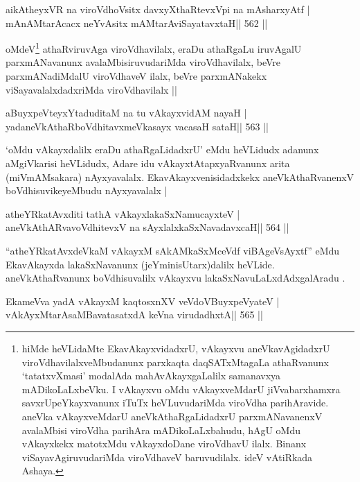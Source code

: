\begin{shl}
aikAtheyxVR na viroVdhoV\s sitx davxyXthaRtevxV\s pi na mAsharxyAtf |
mAnAMtarAcacx neYvAsitx mAMtarAviSayatavxtaH\hfill || 562 ||
\end{shl}

\begin{artha}
oMdeV\footnote[1]{hiMde heVLidaMte EkavAkayxvidadxrU, vAkayxvu
  aneVkavAgidadxrU viroVdhavilalxveMbudanunx parxkaqta daqSATxMtagaLa
  athaRvanunx `tatatxvXmasi' modalAda mahAvAkayxgaLalilx samanavxya
  mADikoLaLxbeVku. I vAkayxvu oMdu vAkayxveMdarU jiVvabarxhamxra
  savxrUpeYkayxvanunx iTuTx heVLuvudariMda viroVdha parihAravide.
  aneVka vAkayxveMdarU aneVkAthaRgaLidadxrU parxmANavanenxV avalaMbisi
  viroVdha parihAra mADikoLaLxbahudu, hAgU oMdu vAkayxkekx matotxMdu
  vAkayxdoDane viroVdhavU ilalx. Binanx viSayavAgiruvudariMda
  viroVdhaveV baruvudilalx. ideV vAtiRkada Ashaya.} athaRviruvAga viroVdhavilalx, eraDu athaRgaLu iruvAgalU
parxmANavanunx avalaMbisiruvudariMda viroVdhavilalx, beVre
parxmANadiMdalU viroVdhaveV ilalx, beVre parxmANakekx
viSayavalalxdadxriMda viroVdhavilalx ||
\end{artha}

\begin{shl}
aBuyxpeVteyxYtaduditaM na tu vAkayxvidAM nayaH |
yadaneVkAthaRboVdhitavxmeVkasayx vacasaH sataH\hfill || 563 ||
\end{shl}

\begin{artha}
`oMdu vAkayxdalilx eraDu athaRgaLidadxrU' eMdu heVLidudx adanunx
  aMgiVkarisi heVLidudx, Adare idu vAkayxtAtapxyaRvanunx arita
  (miVmAMsakara) nAyxyavalalx. EkavAkayxvenisidadxkekx
  aneVkAthaRvanenxV boVdhisuvikeyeMbudu nAyxyavalalx |
\end{artha}



\begin{shl}
atheYRkatAvxditi tathA vAkayxlakaSxNamucayxteV |
aneVkAthARvavoVdhitevxV na sAyxlalxkaSxNavadavxcaH\hfill || 564 ||
\end{shl}

\begin{artha}
``atheYRkatAvxdeVkaM vAkayxM sAkAMkaSxMceVdf viBAgeVsAyxtf'' eMdu   EkavAkayxda lakaSxNavanunx (jeYminisUtarx)dalilx heVLide.   aneVkAthaRvanunx boVdhisuvalilx vAkayxvu lakaSxNavuLaLxdAdxgalAradu   .
\end{artha}

\begin{shl}
EkameVva yadA vAkayxM kaqtosxnXV veVdoV\s BuyxpeVyateV |
vAkAyxMtarAsaMBavatasatxdA keVna virudadhxtA\hfill || 565 ||
\end{shl}

